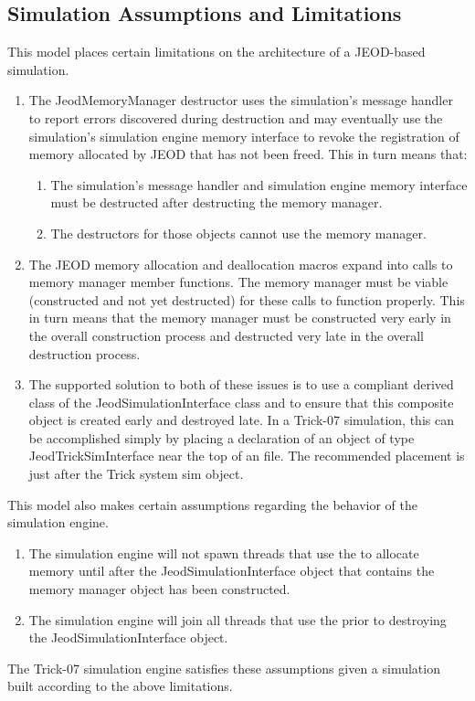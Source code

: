 \subsection{Simulation Assumptions and Limitations}
\label{sec:contraints}
This model places certain limitations on the architecture of a JEOD-based
simulation.
\begin{enumerate}
\item The JeodMemoryManager destructor uses the simulation's message handler
  to report errors discovered during destruction and may eventually use
  the simulation's simulation engine memory interface to revoke the
  registration of memory allocated by JEOD that has not been freed.
  This in turn means that:
  \begin{enumerate}
  \item The simulation's message handler and simulation engine memory
    interface must be destructed after destructing the memory manager.
  \item The destructors for those objects cannot use the memory manager.
  \end{enumerate}
\item The JEOD memory allocation and deallocation macros expand into calls
  to memory manager member functions. The memory manager must be viable
  (constructed and not yet destructed) for these calls to function properly.
  This in turn means that the memory manager must be constructed very
  early in the overall construction process and destructed very late in
  the overall destruction process.
\item The supported solution to both of these issues is to use a compliant
  derived class of the JeodSimulationInterface class and to ensure that
  this composite object is created early and destroyed late. In a Trick-07
  simulation, this can be accomplished simply by placing a declaration of
  an object of type JeodTrickSimInterface near the top of an \Sdefine file.
  The recommended placement is just after the Trick system sim object.
\end{enumerate}

This model also makes certain assumptions regarding the behavior of the
simulation engine.
\begin{enumerate}
\item The simulation engine will not spawn threads that use the \ModelDesc
  to allocate memory until after the JeodSimulationInterface object
  that contains the memory manager object has been constructed.
\item The simulation engine will join all threads that use the \ModelDesc
  prior to destroying the JeodSimulationInterface object.
\end{enumerate}
The Trick-07 simulation engine satisfies these assumptions given a simulation
built according to the above limitations.

